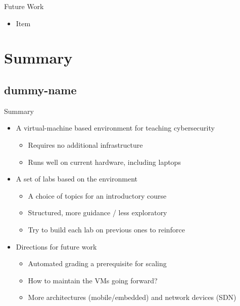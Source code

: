 \documentclass{beamer}
\begin{document}
	\begin{frame}{Future Work}
		\begin{itemize}	
			\item Item
		\end{itemize}
	\end{frame}

	\section{Summary}
	\subsection{dummy-name}	
	\begin{frame}{Summary}
		\begin{itemize}
			\item	A virtual-machine based environment for teaching cybersecurity
			\begin{itemize}			
				\item Requires no additional infrastructure
				\item Runs well on current hardware, including laptops
			\end{itemize}	
			\pause			
			\item A set of labs based on the environment
			\begin{itemize}			
				\item A choice of topics for an introductory course
				\item Structured, more guidance / less exploratory
				\item Try to build each lab on previous ones to reinforce
			\end{itemize}	
			\pause
			\item Directions for future work
			\begin{itemize}			
				\item Automated grading a prerequisite for scaling
				\item How to maintain the VMs going forward?
				\item More architectures (mobile/embedded) and network devices (SDN)
			\end{itemize}								
		\end{itemize}
	\end{frame}
	
\end{document}
